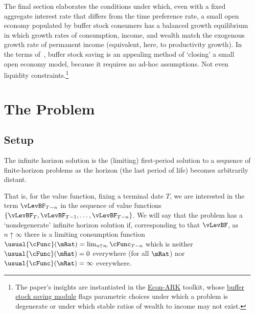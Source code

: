 \documentclass[ProjectDLO]{subfiles}
\begin{document}
The final section elaborates the conditions under which, even with a fixed aggregate interest rate that differs from the time preference rate, a small open economy populated by buffer stock consumers has a balanced growth equilibrium in which growth rates of consumption, income, and wealth match the exogenous growth rate of permanent income (equivalent, here, to productivity growth). In the terms of~\cite{schmitt2003closing}, buffer stock saving is an appealing method of `closing' a small open economy model, because it requires no ad-hoc assumptions.  Not even liquidity constraints.\footnote{The paper's insights are instantiated in the \href{https://econ-ark.org}{Econ-ARK} toolkit, whose \href{https://hark.readthedocs.io/en/stable/reference/ConsumptionSaving/ConsIndShockModel.html}{buffer stock saving module} flags parametric choices under which a problem is degenerate or under which stable ratios of wealth to income may not exist.}


\hypertarget{The-Problem}{}

\section{The Problem}

\subsection{Setup}\label{subsec:Setup}

The infinite horizon solution is the (limiting) first-period solution to a sequence of finite-horizon problems as the horizon (the last period of life) becomes arbitrarily distant.

That is, for the value function, fixing a terminal date $T$,  we are interested in the term $\vLevBF_{T-n}$ in the sequence of value functions $\{\vLevBF_{T},\vLevBF_{T-1},\ldots,\vLevBF_{T-n}\}$.  We will say that the problem has a `nondegenerate' infinite horizon solution if, corresponding to that $\vLevBF$, as $n \uparrow \infty$ there is a limiting consumption function $\usual{\cFunc}(\mRat) = \lim_{n \uparrow \infty} \cFunc_{T-n}$ which is neither $\usual{\cFunc}(\mRat)=0$ everywhere (for all $\mRat$) nor $\usual{\cFunc}(\mRat)=\infty$ everywhere.
\end{document}
